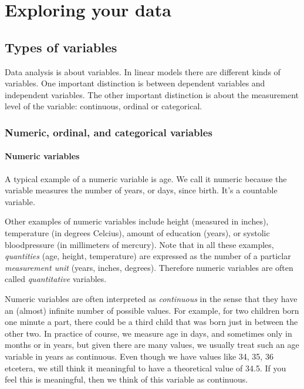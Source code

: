 \chapter{Exploring your data} \label{ch:intro}


\section{Types of variables}
Data analysis is about variables. In linear models there are different kinds of variables. One important distinction is between dependent variables and independent variables. The other important distinction is about the measurement level of the variable: continuous, ordinal or categorical. 


\subsection{Numeric, ordinal, and categorical variables}

\subsubsection{Numeric variables}

A typical example of a numeric variable is age. We call it numeric because the variable measures the number of years, or days, since birth. It's a countable variable. 

Other examples of numeric variables include height (measured in inches), temperature (in degrees Celcius), amount of education (years), or systolic bloodpressure (in millimeters of mercury). Note that in all these examples, \textit{quantities} (age, height, temperature) are expressed as the number of a particlar \textit{measurement unit} (years, inches, degrees). Therefore numeric variables are often called \textit{quantitative} variables. 

Numeric variables are often interpreted as \textit{continuous} in the sense that they have an (almost) infinite number of possible values. For example, for two children born one minute a part, there could be a third child that was born just in between the other two. In practice of course, we measure age in days, and sometimes only in months or in years, but given there are many values, we usually treat such an age variable in years as continuous. Even though we have values like 34, 35, 36 etcetera, we still think it meaningful to have a theoretical value of 34.5. If you feel this is meaningful, then we think of this variable as continuous.

